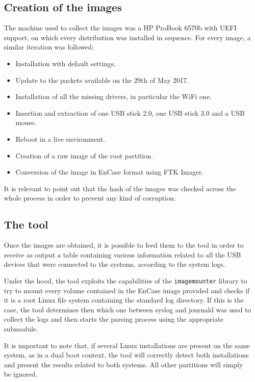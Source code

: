 \documentclass[a4paper]{article}
\begin{document}
\subsection{Creation of the images}
\label{sec:images}
The machine used to collect the images was a HP ProBook 6570b with UEFI
support, on which every distribution was installed in sequence. For every
image, a similar iteration was followed:
\begin{itemize}\label{bullIst}
\item Installation with default settings.
\item Update to the packets available on the 29th of May 2017.
\item Installation of all the missing drivers, in particular the WiFi one.
\item Insertion and extraction of one USB stick 2.0, one USB stick 3.0 and a USB
	mouse.
\item Reboot in a live environment.
\item Creation of a raw image of the root partition.
\item Conversion of the image in EnCase format using FTK Imager.
\end{itemize}
It is relevant to point out that the hash of the images was checked across the
whole process in order to prevent any kind of corruption.

\subsection{The tool}\label{sec:tool}
Once the images are obtained, it is possible to feed them to the tool in order
to receive as output a table containing various information related to all the
USB devices that were connected to the systems, according to the system logs.

Under the hood, the tool exploits the capabilities of the \texttt{imagemounter}
library to try to mount every volume contained in the EnCase image provided and
checks if it is a root Linux file system containing the standard log directory.
If this is the case, the tool determines then which one between syslog and
journald was used to collect the logs and then starts the parsing process using
the appropriate submodule.

It is important to note that, if several Linux installations are present on the
same system, as in a dual boot context, the tool will correctly detect both
installations and present the results related to both systems. All other
partitions will simply be ignored.
\end{document}
